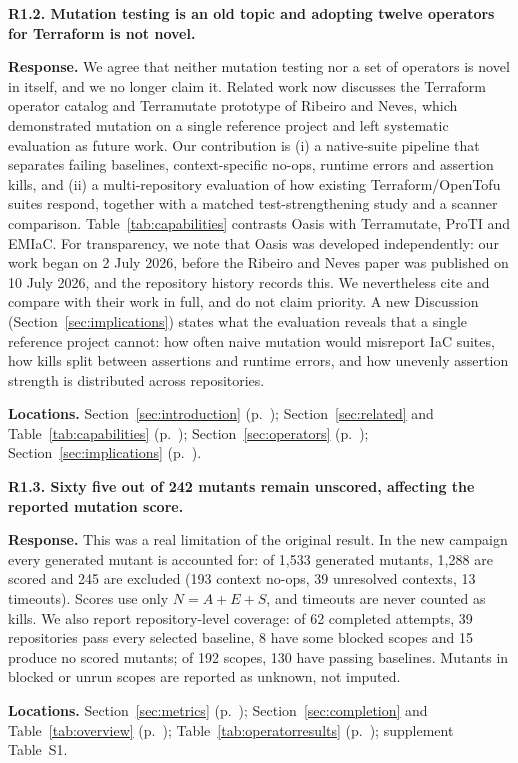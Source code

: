 \medskip
\noindent\textbf{R1.2. Mutation testing is an old topic and adopting twelve operators for Terraform is not novel.}\par
\textbf{Response.} We agree that neither mutation testing nor a set of operators is novel in itself, and we no longer claim it. Related work now discusses the Terraform operator catalog and Terramutate prototype of Ribeiro and Neves, which demonstrated mutation on a single reference project and left systematic evaluation as future work. Our contribution is (i) a native-suite pipeline that separates failing baselines, context-specific no-ops, runtime errors and assertion kills, and (ii) a multi-repository evaluation of how existing Terraform/OpenTofu suites respond, together with a matched test-strengthening study and a scanner comparison. Table~\ref{tab:capabilities} contrasts Oasis with Terramutate, ProTI and EMIaC. For transparency, we note that Oasis was developed independently: our work began on 2 July 2026, before the Ribeiro and Neves paper was published on 10 July 2026, and the repository history records this. We nevertheless cite and compare with their work in full, and do not claim priority. A new Discussion (Section~\ref{sec:implications}) states what the evaluation reveals that a single reference project cannot: how often naive mutation would misreport IaC suites, how kills split between assertions and runtime errors, and how unevenly assertion strength is distributed across repositories.\par
\textbf{Locations.} Section~\ref{sec:introduction} (p.~\pageref{sec:introduction}); Section~\ref{sec:related} and Table~\ref{tab:capabilities} (p.~\pageref{tab:capabilities}); Section~\ref{sec:operators} (p.~\pageref{sec:operators}); Section~\ref{sec:implications} (p.~\pageref{sec:implications}).

\medskip
\noindent\textbf{R1.3. Sixty five out of 242 mutants remain unscored, affecting the reported mutation score.}\par
\textbf{Response.} This was a real limitation of the original result. In the new campaign every generated mutant is accounted for: of 1,533 generated mutants, 1,288 are scored and 245 are excluded (193 context no-ops, 39 unresolved contexts, 13 timeouts). Scores use only $N=A+E+S$, and timeouts are never counted as kills. We also report repository-level coverage: of 62 completed attempts, 39 repositories pass every selected baseline, 8 have some blocked scopes and 15 produce no scored mutants; of 192 scopes, 130 have passing baselines. Mutants in blocked or unrun scopes are reported as unknown, not imputed.\par
\textbf{Locations.} Section~\ref{sec:metrics} (p.~\pageref{sec:metrics}); Section~\ref{sec:completion} and Table~\ref{tab:overview} (p.~\pageref{tab:overview}); Table~\ref{tab:operatorresults} (p.~\pageref{tab:operatorresults}); supplement Table~S1.

